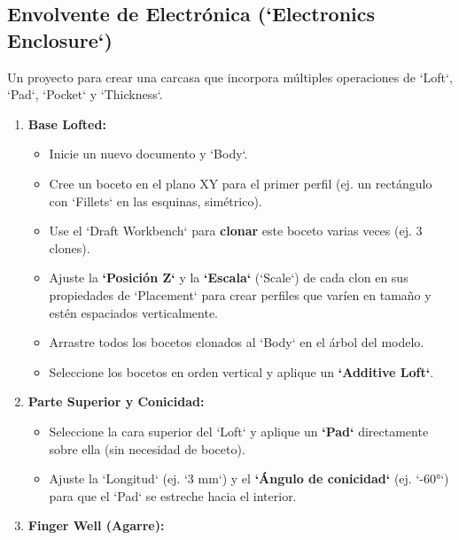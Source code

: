 \documentclass[12pt]{article}
\begin{document}

\subsection{Envolvente de Electrónica (`Electronics Enclosure`)}
Un proyecto para crear una carcasa que incorpora múltiples operaciones de `Loft`, `Pad`, `Pocket` y `Thickness`.
\begin{enumerate}[label=\arabic*)]
    \item \textbf{Base Lofted:}
    \begin{itemize}[label=\textendash]
        \item Inicie un nuevo documento y `Body`.
        \item Cree un boceto en el plano XY para el primer perfil (ej. un rectángulo con `Fillets` en las esquinas, simétrico).
        \item Use el `Draft Workbench` para \textbf{clonar} este boceto varias veces (ej. 3 clones).
        \item Ajuste la \textbf{`Posición Z`} y la \textbf{`Escala`} (`Scale`) de cada clon en sus propiedades de `Placement` para crear perfiles que varíen en tamaño y estén espaciados verticalmente.
        \item Arrastre todos los bocetos clonados al `Body` en el árbol del modelo.
        \item Seleccione los bocetos en orden vertical y aplique un \textbf{`Additive Loft`}.
    \end{itemize}
    \item \textbf{Parte Superior y Conicidad:}
    \begin{itemize}[label=\textendash]
        \item Seleccione la cara superior del `Loft` y aplique un \textbf{`Pad`} directamente sobre ella (sin necesidad de boceto).
        \item Ajuste la `Longitud` (ej. `3 mm`) y el \textbf{`Ángulo de conicidad`} (ej. `-60°`) para que el `Pad` se estreche hacia el interior.
    \end{itemize}
    \item \textbf{Finger Well (Agarre):}

\end{enumerate}
\end{document}
